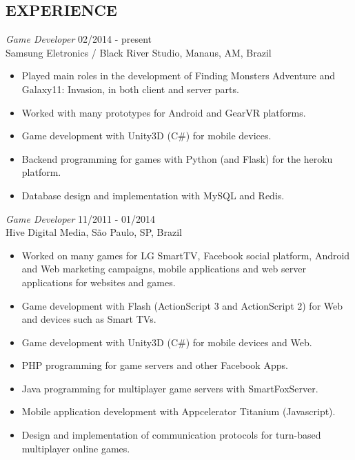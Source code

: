 \documentclass[line,margin]{res}
\begin{document}
\begin{resume}
\section{EXPERIENCE} {\sl Game Developer} \hfill 02/2014 - present \\
                Samsung Eletronics / Black River Studio, Manaus, AM, Brazil
                 \begin{itemize}  \itemsep 1.25pt
                 \item Played main roles in the development of Finding Monsters Adventure and Galaxy11: Invasion, in both client and server parts.
                 \item Worked with many prototypes for Android and GearVR platforms.
                 \item Game development with Unity3D (C\#) for mobile devices.
				 \item Backend programming for games with Python (and Flask) for the heroku platform.
                 \item Database design and implementation with MySQL and Redis.
                 \end{itemize}
                 
				{\sl Game Developer} \hfill 11/2011 - 01/2014 \\
                Hive Digital Media, São Paulo, SP, Brazil
                 \begin{itemize}  \itemsep 1.25pt
                 \item Worked on many games for LG SmartTV, Facebook social platform, Android and Web marketing campaigns, mobile applications and web server applications for websites and games.
                 \item Game development with Flash (ActionScript 3 and ActionScript 2) for Web and devices such as Smart TVs.
		 		 \item Game development with Unity3D (C\#) for mobile devices and Web.
                 \item PHP programming for game servers and other Facebook Apps.
                 \item Java programming for multiplayer game servers with SmartFoxServer.
		 		 \item Mobile application development with Appcelerator Titanium (Javascript).
                 \item Design and implementation of communication protocols for turn-based multiplayer online games.
                 \end{itemize}
                 

\end{resume}
\end{document}
